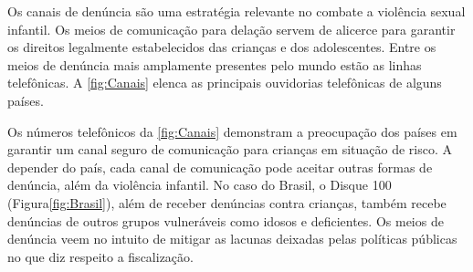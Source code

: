 \begin{figure}
  \vspace{-8pt}
\end{figure}


Os canais de denúncia são uma estratégia relevante no combate a violência sexual infantil. Os meios de comunicação para delação servem de alicerce para garantir os direitos legalmente estabelecidos das crianças e dos adolescentes. Entre os meios de denúncia mais amplamente presentes pelo mundo estão as linhas telefônicas. A \autoref{fig:Canais} elenca as principais ouvidorias telefônicas de alguns países.


Os números telefônicos da \autoref{fig:Canais} demonstram a preocupação dos países em garantir um canal seguro de comunicação para crianças em situação de risco. A depender do país, cada canal de comunicação pode aceitar outras formas de denúncia, além da violência infantil. No caso do Brasil, o Disque 100 (Figura\autoref{fig:Brasil}), além de receber denúncias contra crianças, também recebe denúncias de outros grupos vulneráveis como idosos e deficientes. Os meios de denúncia veem no intuito de mitigar as lacunas deixadas pelas políticas públicas no que diz respeito a fiscalização.

